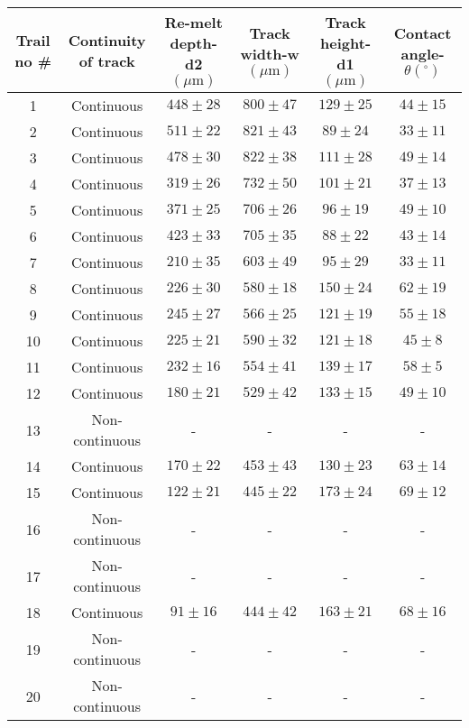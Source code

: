 \documentclass[10pt]{article}
\begin{document}
\begin{center}
\begin{tabular}{|c|c|c|c|c|c|}
\hline
Trail no \# & Continuity of track & Re-melt depth-d2 $(\mu \mathrm{m})$ & Track width-w $(\mu \mathrm{m})$ & Track height-d1 $(\mu \mathrm{m})$ & Contact angle- $\theta\left({ }^{\circ}\right)$ \\
\hline
1 & Continuous & $448 \pm 28$ & $800 \pm 47$ & $129 \pm 25$ & $44 \pm 15$ \\
\hline
2 & Continuous & $511 \pm 22$ & $821 \pm 43$ & $89 \pm 24$ & $33 \pm 11$ \\
\hline
3 & Continuous & $478 \pm 30$ & $822 \pm 38$ & $111 \pm 28$ & $49 \pm 14$ \\
\hline
4 & Continuous & $319 \pm 26$ & $732 \pm 50$ & $101 \pm 21$ & $37 \pm 13$ \\
\hline
5 & Continuous & $371 \pm 25$ & $706 \pm 26$ & $96 \pm 19$ & $49 \pm 10$ \\
\hline
6 & Continuous & $423 \pm 33$ & $705 \pm 35$ & $88 \pm 22$ & $43 \pm 14$ \\
\hline
7 & Continuous & $210 \pm 35$ & $603 \pm 49$ & $95 \pm 29$ & $33 \pm 11$ \\
\hline
8 & Continuous & $226 \pm 30$ & $580 \pm 18$ & $150 \pm 24$ & $62 \pm 19$ \\
\hline
9 & Continuous & $245 \pm 27$ & $566 \pm 25$ & $121 \pm 19$ & $55 \pm 18$ \\
\hline
10 & Continuous & $225 \pm 21$ & $590 \pm 32$ & $121 \pm 18$ & $45 \pm 8$ \\
\hline
11 & Continuous & $232 \pm 16$ & $554 \pm 41$ & $139 \pm 17$ & $58 \pm 5$ \\
\hline
12 & Continuous & $180 \pm 21$ & $529 \pm 42$ & $133 \pm 15$ & $49 \pm 10$ \\
\hline
13 & Non-continuous & - & - & - & - \\
\hline
14 & Continuous & $170 \pm 22$ & $453 \pm 43$ & $130 \pm 23$ & $63 \pm 14$ \\
\hline
15 & Continuous & $122 \pm 21$ & $445 \pm 22$ & $173 \pm 24$ & $69 \pm 12$ \\
\hline
16 & Non-continuous & - & - & - & - \\
\hline
17 & Non-continuous & - & - & - & - \\
\hline
18 & Continuous & $91 \pm 16$ & $444 \pm 42$ & $163 \pm 21$ & $68 \pm 16$ \\
\hline
19 & Non-continuous & - & - & - & - \\
\hline
20 & Non-continuous & - & - & - & - \\

\end{tabular}
\end{center}
\end{document}
